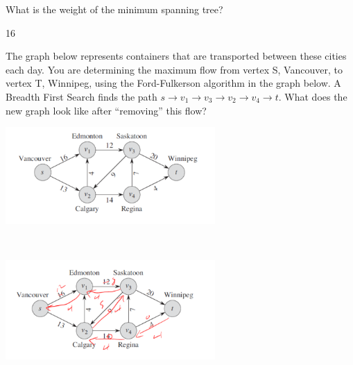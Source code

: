 \documentclass[12pt]{article}
\newenvironment{sol}[1][Solution]{\begin{trivlist}\item[\hskip\labelsep {\bfseries #1:}]}{\end{trivlist}}
\begin{document}
\begin{enumerate}
\begin{enumerate}
        \item What is the weight of the minimum spanning tree?
        \begin{sol}
        16
        \end{sol}
    \end{enumerate}
    \item  [8 pts] The graph below represents containers that are transported between these cities each day. You are determining the maximum flow from vertex S, Vancouver, to vertex T, Winnipeg, using the Ford-Fulkerson algorithm in the graph below. A Breadth First Search finds the path $s \rightarrow v_1 \rightarrow v_3 \rightarrow v_2 \rightarrow v_4 \rightarrow t$. What does the new graph look like after “removing” this flow?
        \begin{center}
            \includegraphics[width = 0.6\textwidth]{p7.png}
    \end{center}
    \begin{sol}
    \hspace*{\fill}\\
        \begin{center}
            \includegraphics[width = 0.6\textwidth]{p8.png}
    \end{center}
    \end{sol}


\end{enumerate}
\end{document}
